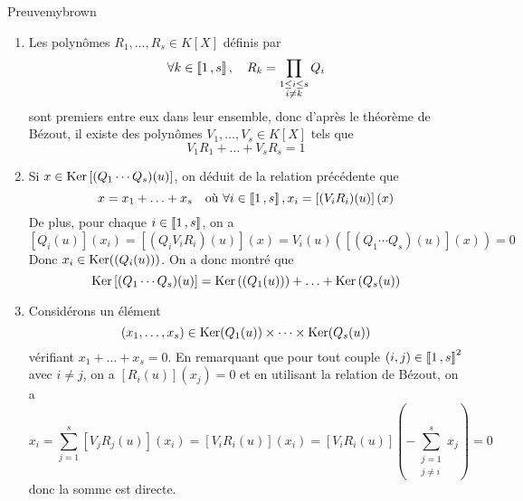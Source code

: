     \begin{demo}{Preuve}{mybrown}
        \begin{enumerate}[label=\textcolor{myjade}{(\arabic*)}]
            \item Les polynômes $R_1,\ldots,R_s \in K[X]$ définis par 
            \[ \forall k \in \left\llbracket 1 \, , s \right\rrbracket, \quad R_k = \prod_{\substack{1 \leq i \leq s \\ i \neq k}} Q_i \]    
            sont premiers entre eux dans leur ensemble, donc d’après le théorème de Bézout, il existe des polynômes $V_1, \ldots, V_s \in K[X]$ tels que 
            \[ V_1 R_1 + \ldots + V_s R_s = 1 \]    
            \item Si $x \in \operatorname{Ker}\left[(Q_1\cdots Q_s)(u)\right]$, on déduit de la relation précédente que 
            \[ x = x_1 + \ldots + x_s \quad \text{où } \forall i \in \left\llbracket 1 \, , s \right\rrbracket, x_i = \left[(V_i R_i)(u)\right](x) \]
            De plus, pour chaque $i \in \left\llbracket 1 \, , s \right\rrbracket$, on a 
            \[ \left[Q_i(u)\right](x_i) = \left[(Q_i V_i R_i)(u)\right](x) = V_i(u) \left(\left[(Q_1 \cdots Q_s)(u)\right](x)\right) = 0 \]
            Donc $x_i \in \operatorname{Ker}((Q_i(u)))$. On a donc montré que 
            \[ \operatorname{Ker}\left[(Q_1 \cdots Q_s)(u)\right] = \operatorname{Ker}\left((Q_1(u))\right) + \ldots + \operatorname{Ker}\left(Q_s(u)\right) \]     
            \item Considérons un élément 
            \[ (x_1,\ldots,x_s) \in \operatorname{Ker}(Q_1(u)) \times \cdots \times \operatorname{Ker}(Q_s(u)) \]   
            vérifiant $x_1 + \ldots + x_s = 0$. En remarquant que pour tout couple $(i,j) \in \left\llbracket 1 \, , s \right\rrbracket^2$ avec $i \neq j$, on a $\left[R_i(u)\right](x_j) = 0$ et en utilisant la relation de Bézout, on a 
            \[ x_i = \sum_{j=1}^{s} \left[V_j R_j(u)\right](x_i) = \left[V_i R_i (u)\right](x_i) = \left[V_i R_i(u)\right]\left(- \sum_{\substack{j = 1 \\ j \neq i}}^{s} x_j\right) = 0 \]
            donc la somme est directe.
        \end{enumerate}
    \end{demo}

